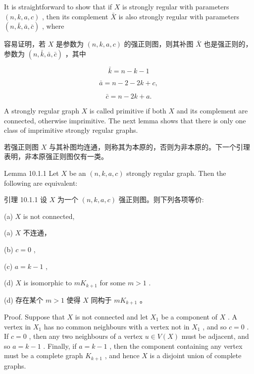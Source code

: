 \documentclass[10pt]{article}
\begin{document}
It is straightforward to show that if \(X\) is strongly regular with parameters \(\left( {n,k,a,c}\right)\) , then its complement \(\bar{X}\) is also strongly regular with parameters \(\left( {n,\bar{k},\bar{a},\bar{c}}\right)\) , where

\begin{tcolorbox}\relax
容易证明，若 \(X\) 是参数为 \(\left( {n,k,a,c}\right)\) 的强正则图，则其补图 \(\bar{X}\) 也是强正则的，参数为 \(\left( {n,\bar{k},\bar{a},\bar{c}}\right)\) ，其中
\end{tcolorbox}

\[
\bar{k} = n - k - 1
\]

\[
\bar{a} = n - 2 - {2k} + c,
\]

\[
\bar{c} = n - {2k} + a.
\]

A strongly regular graph \(X\) is called primitive if both \(X\) and its complement are connected, otherwise imprimitive. The next lemma shows that there is only one class of imprimitive strongly regular graphs.

\begin{tcolorbox}\relax
若强正则图 \(X\) 与其补图均连通，则称其为本原的，否则为非本原的。下一个引理表明，非本原强正则图仅有一类。
\end{tcolorbox}

Lemma 10.1.1 Let \(X\) be an \(\left( {n,k,a,c}\right)\) strongly regular graph. Then the following are equivalent:

\begin{tcolorbox}\relax
引理 10.1.1 设 \(X\) 为一个 \(\left( {n,k,a,c}\right)\) 强正则图。则下列各项等价:
\end{tcolorbox}

(a) \(X\) is not connected,

\begin{tcolorbox}\relax
(a) \(X\) 不连通，
\end{tcolorbox}

(b) \(c = 0\) ,

(c) \(a = k - 1\) ,

(d) \(X\) is isomorphic to \(m{K}_{k + 1}\) for some \(m > 1\) .

\begin{tcolorbox}\relax
(d) 存在某个 \(m > 1\) 使得 \(X\) 同构于 \(m{K}_{k + 1}\) 。
\end{tcolorbox}

Proof. Suppose that \(X\) is not connected and let \({X}_{1}\) be a component of \(X\) . A vertex in \({X}_{1}\) has no common neighbours with a vertex not in \({X}_{1}\) , and so \(c = 0\) . If \(c = 0\) , then any two neighbours of a vertex \(u \in  V\left( X\right)\) must be adjacent, and so \(a = k - 1\) . Finally, if \(a = k - 1\) , then the component containing any vertex must be a complete graph \({K}_{k + 1}\) , and hence \(X\) is a disjoint union of complete graphs.
\end{document}
